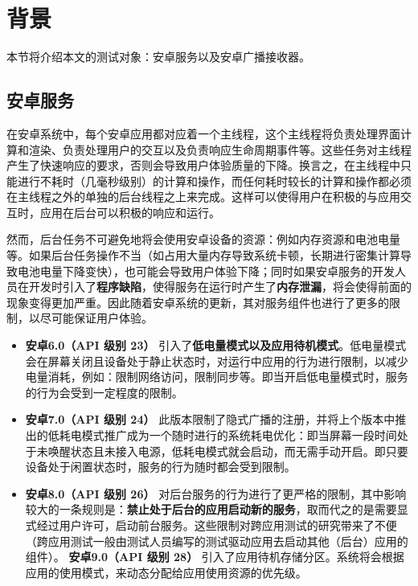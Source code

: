 \chapter{背景}\label{chapter_background}

本节将介绍本文的测试对象：安卓服务以及安卓广播接收器。
\section{安卓服务}

在安卓系统中，每个安卓应用都对应着一个主线程，这个主线程将负责处理界面计算和渲染、负责处理用户的交互以及负责响应生命周期事件等。这些任务对主线程产生了快速响应的要求，否则会导致用户体验质量的下降。换言之，在主线程中只能进行不耗时（几毫秒级别）的计算和操作，而任何耗时较长的计算和操作都必须在主线程之外的单独的后台线程之上来完成。这样可以使得用户在积极的与应用交互时，应用在后台可以积极的响应和运行。

然而，后台任务不可避免地将会使用安卓设备的资源：例如内存资源和电池电量等。如果后台任务操作不当（如占用大量内存导致系统卡顿，长期进行密集计算导致电池电量下降变快），也可能会导致用户体验下降；同时如果安卓服务的开发人员在开发时引入了\textbf{程序缺陷}，使得服务在运行时产生了\textbf{内存泄漏}，将会使得前面的现象变得更加严重。因此随着安卓系统的更新，其对服务组件也进行了更多的限制，以尽可能保证用户体验。

\begin{itemize}
	\item \textbf{安卓6.0（API 级别 23） } 引入了\textbf{低电量模式以及应用待机模式}。低电量模式会在屏幕关闭且设备处于静止状态时，对运行中应用的行为进行限制，以减少电量消耗，例如：限制网络访问，限制同步等。即当开启低电量模式时，服务的行为会受到一定程度的限制。
	\item \textbf{安卓7.0（API 级别 24）} 此版本限制了隐式广播的注册，并将上个版本中推出的低耗电模式推广成为一个随时进行的系统耗电优化：即当屏幕一段时间处于未唤醒状态且未接入电源，低耗电模式就会启动，而无需手动开启。即只要设备处于闲置状态时，服务的行为随时都会受到限制。
	\item \textbf{安卓8.0（API 级别 26）} 对后台服务的行为进行了更严格的限制，其中影响较大的一条规则是：\textbf{禁止处于后台的应用启动新的服务}，取而代之的是需要显式经过用户许可，启动前台服务。这些限制对跨应用测试的研究带来了不便（跨应用测试一般由测试人员编写的测试驱动应用去启动其他（后台）应用的组件）。
	\textbf{安卓9.0（API 级别 28）} 引入了应用待机存储分区。系统将会根据应用的使用模式，来动态分配给应用使用资源的优先级。
\end{itemize}

